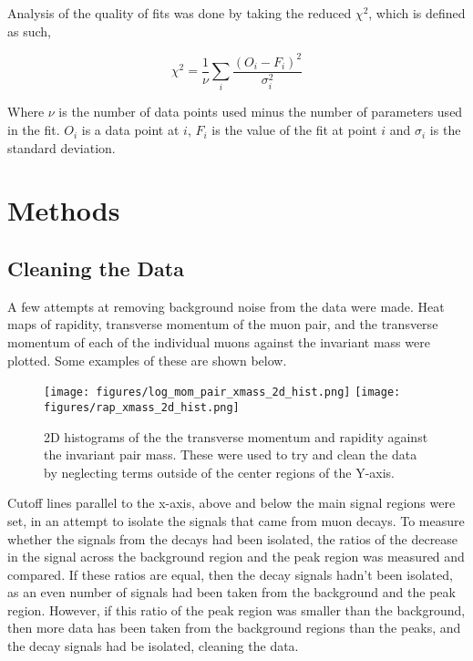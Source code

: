 \documentclass[A4sheet,12pt]{article}
\begin{document}
Analysis of the quality of fits was done by taking the reduced $\chi ^2$, which is defined as such,

\begin{equation}
    \chi ^2 = \frac{1}{\nu} \sum_i \frac{(O_i - F_i)^2}{\sigma_{i}^{2} }
\end{equation}

Where $\nu$ is the number of data points used minus the number of parameters used in the fit. $O_i$ is a data point at $i$, $F_i$ is the value of the fit at point $i$ and $\sigma_i$ is the standard deviation.




\section*{Methods}
\subsection*{Cleaning the Data}

A few attempts at removing background noise from the data were made. Heat maps of rapidity, transverse momentum of the muon pair, and the transverse momentum of each of the individual muons against the invariant mass were plotted. Some examples of these are shown below.

\begin{figure}[H]
\centering
\texttt{[image: figures/log\_mom\_pair\_xmass\_2d\_hist.png]}
\texttt{[image: figures/rap\_xmass\_2d\_hist.png]}
\caption{2D histograms of the the transverse momentum and rapidity against the invariant pair mass. These were used to try and clean the data by neglecting terms outside of the center regions of the Y-axis.}
\label{fig:2d_hists_ex}
\end{figure}

Cutoff lines parallel to the x-axis, above and below the main signal regions were set, in an attempt to isolate the signals that came from muon decays. To measure whether the signals from the decays had been isolated, the ratios of the decrease in the signal across the background region and the peak region was measured and compared. If these ratios are equal, then the decay signals hadn't been isolated, as an even number of signals had been taken from the background and the peak region. However, if this ratio of the peak region was smaller than the background, then more data has been taken from the background regions than the peaks, and the decay signals had be isolated, cleaning the data. \\
\end{document}
